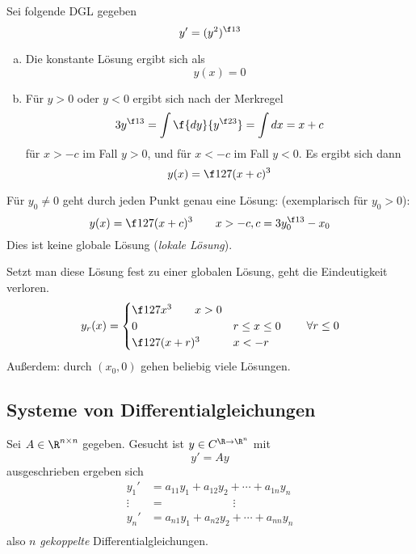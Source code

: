 \documentclass[a4paper,10pt]{scrartcl}
\begin{document}
\begin{ex} \label{2.3}
	Sei folgende DGL gegeben
	\[
		y' = (y^2)^{\f 13}
	\]
	\begin{enumerate}[a)]
		\item
			Die konstante Lösung ergibt sich als
			\[
				y(x) = 0
			\]
		\item
			Für $y > 0$ oder $y < 0$ ergibt sich nach der Merkregel
			\[
				3 y^{\f 13} = \int \f {dy}{y^{\f 23}} = \int  dx = x + c 
			\]
			für $x > -c$ im Fall $y > 0$, und für $x < -c$ im Fall $y < 0$.
			Es ergibt sich dann
			\[
				y(x) = \f 1{27}(x + c)^3
			\]
	\end{enumerate}
	\begin{note}[Beobachtungen]
		Für $y_0 \neq 0$ geht durch jeden Punkt genau eine Lösung:
		(exemplarisch für $y_0 > 0$):
		\[
			y(x) = \f 1{27}(x+c)^3  
			\qquad x > -c, c = 3y_0^{\f 13} - x_0
		\]
		Dies ist keine globale Lösung (\emph{lokale Lösung}).

		Setzt man diese Lösung fest zu einer globalen Lösung, geht die Eindeutigkeit verloren.
		\[
			y_r(x) = \begin{cases}
				\f 1{27} x^3 \qquad x > 0 \\
				0 & r \le x \le 0 \\
				\f 1{27} (x+r)^3 & x < -r
			\end{cases}
			\qquad \forall r \le 0
		\]
		Außerdem: durch $(x_0, 0)$ gehen beliebig viele Lösungen.
	\end{note}
\end{ex}


\subsection{Systeme von Differentialgleichungen}


Sei $A \in \R^{n\times n}$ gegeben.
Gesucht ist $y \in C^{\R \to \R^n}$ mit
\[
	y' = Ay
\]
ausgeschrieben ergeben sich
\begin{align*}
	y_1' &= a_{11} y_1 + a_{12} y_2 + \dotsb + a_{1n} y_n \\
	\vdots \; &= \qquad\qquad\qquad \vdots \\
	y_n' &= a_{n1} y_1 + a_{n2} y_2 + \dotsb + a_{nn} y_n \\
\end{align*}
also $n$ \emph{gekoppelte} Differentialgleichungen.
\end{document}
